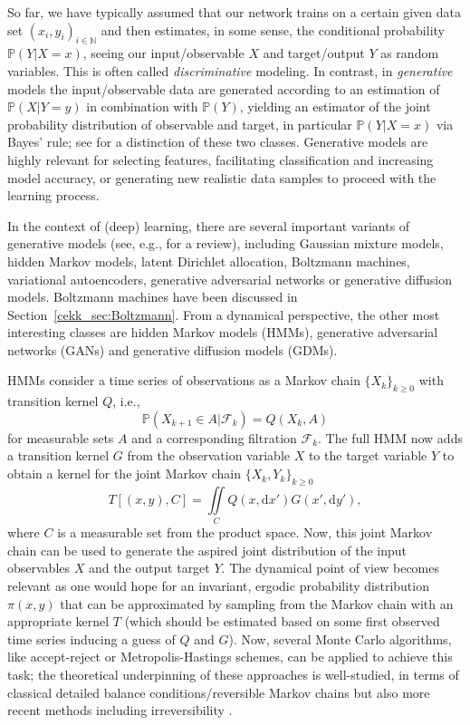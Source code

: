 \documentclass[10pt]{article}
\begin{document}
So far, we have typically assumed that our network trains on a certain given data set $(x_i, y_i)_{i \in \mathbb{N}}$ and then estimates, in some sense, the conditional probability $\mathbb{P}(Y | X =x)$, seeing our input/observable $X$ and target/output $Y$ as random variables. This is often called \emph{discriminative} modeling.
In contrast, in \emph{generative} models the input/observable data are generated according to an estimation of $\mathbb{P}(X | Y=y)$ in combination with $\mathbb{P}(Y)$, yielding an estimator of the joint probability distribution of observable and target, in particular $\mathbb{P}(Y | X =x)$ via Bayes' rule; see \cite{NgJordan} for a distinction of these two classes. Generative models are highly relevant for selecting features, facilitating classification and increasing model accuracy, or generating new realistic data samples to proceed with the learning process.

In the context of (deep) learning, there are several important variants of generative models (see, e.g., \cite{Harshvardhanetal} for a review), including Gaussian mixture models, hidden Markov models, latent Dirichlet allocation, Boltzmann machines, variational autoencoders, generative adversarial networks or generative diffusion models. Boltzmann machines have been discussed in Section~\ref{cekk_sec:Boltzmann}. From a dynamical perspective, the other most interesting classes are hidden Markov models (HMMs), generative adversarial networks (GANs) and generative diffusion models (GDMs).


HMMs \cite{CappeMoulinesRyden} consider a time series of observations as a Markov chain $\{X_k\}_{k \geq 0}$ with transition kernel $Q$, i.e.,
$$ \mathbb{P}(X_{k+1} \in A | \mathcal F_k ) = Q(X_k, A)$$
for measurable sets $A$ and a corresponding filtration $\mathcal F_k$. The full HMM now adds a transition kernel $G$ from the observation variable $X$ to the target variable $Y$ to obtain a kernel for the joint Markov chain $\{X_k, Y_k\}_{k \geq 0}$
$$ T[(x,y), C] = \iint\limits_C Q(x, \text{d} x') G(x', \text{d} y'), $$
where $C$ is a measurable set from the product space.
Now, this joint Markov chain can be used to generate the aspired joint distribution of the input observables $X$ and the output target $Y$. 
The dynamical point of view becomes relevant as one would hope for an invariant, ergodic probability distribution $\pi(x,y)$ that can be approximated by sampling from the Markov chain with an appropriate kernel $T$ (which should be estimated based on some first observed time series inducing a guess of $Q$ and $G$). Now, several Monte Carlo algorithms, like accept-reject or Metropolis-Hastings schemes, can be applied to achieve this task; the theoretical underpinning of these approaches is well-studied, in terms of classical detailed balance conditions/reversible Markov chains \cite{RobertCasella} but also more recent methods including irreversibility \cite{Ottobre}.
\end{document}
